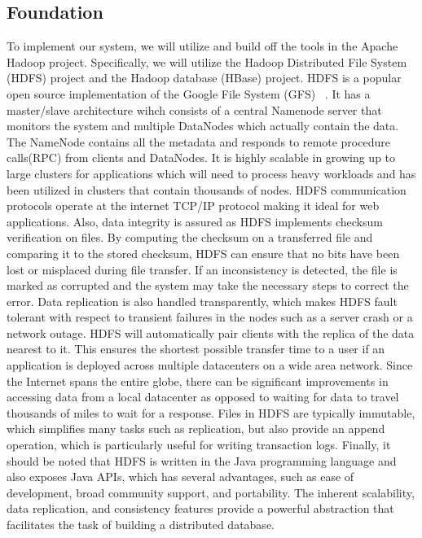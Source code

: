 \documentclass[10pt,final,journal]{IEEEtran}
\begin{document}
\subsection{Foundation}
To implement our system, we will utilize and build off the tools in the Apache Hadoop project. Specifically, we will utilize the Hadoop Distributed File System (HDFS) project and the Hadoop database (HBase) project. HDFS is a popular open source implementation of the Google File System (GFS) ~\cite{Ghemawat:2003:GFS:1165389.945450}. It has a master/slave architecture wihch consists of a central Namenode server that monitors the system and multiple DataNodes which actually contain the data. The NameNode contains all the metadata and responds to remote procedure calls(RPC) from clients and DataNodes. It is highly scalable in growing up to large clusters for applications which will need to process heavy workloads and has been utilized in clusters that contain thousands of nodes.  HDFS communication protocols operate at the internet TCP/IP protocol making it ideal for web applications. Also, data integrity is assured as HDFS implements checksum verification on files. By computing the checksum on a transferred file and comparing it to the stored checksum, HDFS can ensure that no bits have been lost or misplaced during file transfer. If an inconsistency is detected, the file is marked as corrupted and the system may take the necessary steps to correct the error.  Data replication is also handled transparently, which makes HDFS fault tolerant with respect to transient failures in the nodes such as a server crash or a network outage. HDFS will automatically pair clients with the replica of the data nearest to it. This ensures the shortest possible transfer time to a user if an application is deployed across multiple datacenters on a wide area network. Since the Internet spans the entire globe, there can be significant improvements in accessing data from a local datacenter as opposed to waiting for data to travel thousands of miles to wait for a response. Files in HDFS are typically immutable, which simplifies many tasks such as replication, but also provide an append operation, which is particularly useful for writing transaction logs. Finally, it should be noted that HDFS is written in the Java programming language and also exposes Java APIs, which has several advantages, such as ease of development, broad community support, and portability. The inherent scalability, data replication, and consistency features provide a powerful abstraction that facilitates the task of building a distributed database.
\end{document}

